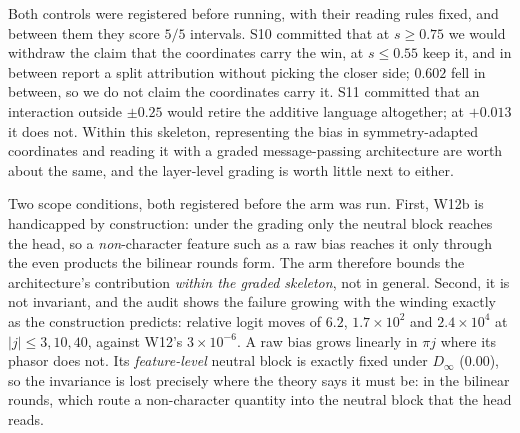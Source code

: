 \documentclass[10pt,twocolumn,letterpaper]{article}
\theoremstyle{definition}
\newcommand{\Dinf}{D_\infty}
\begin{document}
Both controls were registered before running, with their reading rules fixed, and between them they
score $5/5$ intervals. S10 committed that at $s \ge 0.75$ we would withdraw the claim that the
coordinates carry the win, at $s \le 0.55$ keep it, and in between report a split attribution
without picking the closer side; $0.602$ fell in between, so we do not claim the coordinates carry
it. S11 committed that an interaction outside $\pm0.25$ would retire the additive language
altogether; at $+0.013$ it does not. Within this skeleton, representing the bias in
symmetry-adapted coordinates and reading it with a graded message-passing architecture are worth
about the same, and the layer-level grading is worth little next to either.

Two scope conditions, both registered before the arm was run. First, W12b is handicapped by
construction: under the grading only the neutral block reaches the head, so a \emph{non}-character
feature such as a raw bias reaches it only through the even products the bilinear rounds form. The
arm therefore bounds the architecture's contribution \emph{within the graded skeleton}, not in
general. Second, it is not invariant, and the audit shows the failure growing with the winding exactly as
the construction predicts: relative logit moves of $6.2$, $1.7\times10^2$ and $2.4\times10^4$ at
$|j| \le 3, 10, 40$, against W12's $3\times10^{-6}$. A raw bias grows linearly in $\pi j$ where its
phasor does not. Its \emph{feature-level} neutral block is exactly
fixed under $\Dinf$ ($0.00$), so the invariance is lost precisely where the theory says it must be:
in the bilinear rounds, which route a non-character quantity into the neutral block that the head
reads.
\end{document}
